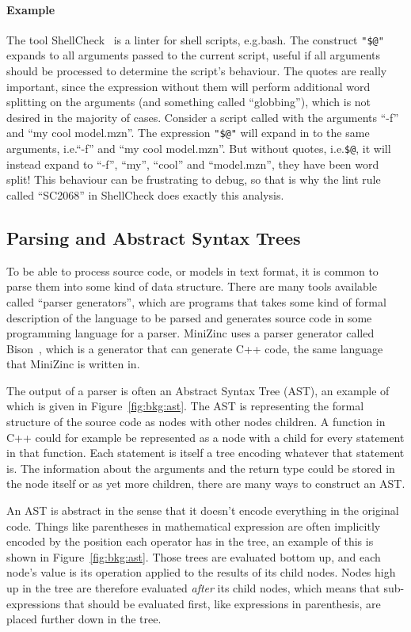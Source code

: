 \documentclass[a4paper,12pt]{article}
\begin{document}
\paragraph{Example}
The tool ShellCheck~\cite{shellcheck} is a linter for shell scripts, e.g.\@ bash. The
construct \texttt{"\$@"} expands to all arguments passed to the current script, useful if
all arguments should be processed to determine the script's behaviour. The quotes are
really important, since the expression without them will perform additional word splitting
on the arguments (and something called ``globbing''), which is not desired in the majority
of cases. Consider a script called with the arguments ``-f'' and ``my cool model.mzn''.
The expression \texttt{"\$@"} will expand in to the same arguments, i.e.\@ ``-f'' and ``my
cool model.mzn''. But without quotes, i.e.\@ \texttt{\$@}, it will instead expand to ``-f'',
``my'', ``cool'' and ``model.mzn'', they have been word split! This behaviour can be
frustrating to debug, so that is why the lint rule
called ``SC2068'' in ShellCheck does exactly this analysis.

\subsection{Parsing and Abstract Syntax Trees}\label{sec:parsing}
To be able to process source code, or models in text format, it is common to parse them
into some kind of data structure. There are many tools available called ``parser
generators'', which are programs that takes some kind of formal description of the
language to be parsed and generates source code in some programming language for a parser.
MiniZinc uses a parser generator called Bison~\cite{flexbison}, which is a generator that
can generate C++ code, the same language that MiniZinc is written in.

The output of a parser is often an Abstract Syntax Tree (AST), an example of which is
given in Figure~\ref{fig:bkg:ast}. The AST is representing the formal structure of the
source code as nodes with other nodes children. A function in C++ could for example be
represented as a node with a child for every statement in that function. Each statement is
itself a tree encoding whatever that statement is. The information
about the arguments and the return type could be stored in the node itself or as yet more
children, there are many ways to construct an AST.

An AST is abstract in the sense that it doesn't encode everything in the original code.
Things like parentheses in mathematical expression are often implicitly encoded by the
position each operator has in the tree, an example of this is shown in
Figure~\ref{fig:bkg:ast}. Those trees are evaluated bottom up, and each node's value is
its operation applied to the results of its child nodes. Nodes high up in the tree are
therefore evaluated \emph{after} its child nodes, which means that sub-expressions that
should be evaluated first, like expressions in parenthesis, are placed further down in the
tree.
\end{document}

